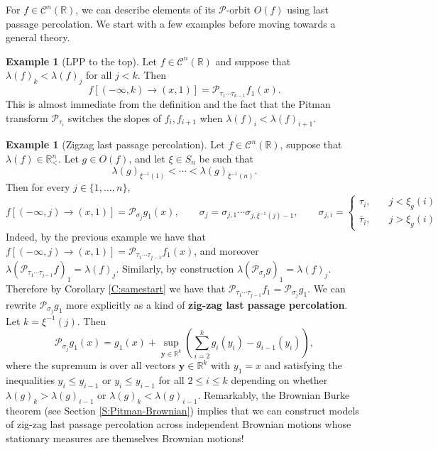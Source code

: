 \documentclass[11pt]{article}
\newcommand{\R}{\mathbb{R}}
\newcommand{\sig}{\sigma}
\newcommand{\la}{\lambda}
\newcommand{\cC}{\mathcal{C}}
\newcommand{\cP}{\mathcal{P}}
\newcommand{\by}{\mathbf{y}}
\theoremstyle{definition} %
\newtheorem{example}[theorem]{Example}
\theoremstyle{remark} %
\begin{document}
For $f \in \cC^n(\R)$, we can describe elements of its $\cP$-orbit $O(f)$ using last passage percolation. We start with a few examples before moving towards a general theory.

\begin{example}[LPP to the top]
	\label{Ex:cars}
Let $f \in \cC^n(\R)$ and suppose that $\la(f)_k < \la(f)_j$ for all $j < k$.	Then 
	\begin{equation}\label{e:cars}
		f[(-\infty, k)\to (x,1)]=\cP_{\tau_1\cdots \tau_{k-1}} f_1(x).
	\end{equation}
This is almost immediate from the definition and the fact that the Pitman transform $\cP_{\tau_i}$ switches the slopes of $f_i, f_{i+1}$ when $\la(f)_i < \la(f)_{i+1}$.  
\end{example}
\begin{example}[Zigzag last passage percolation]
\label{Ex:zigzag}
Let $f \in \cC^n(\R)$, suppose that $\la(f) \in \R^n_<$. Let $g \in O(f)$, and let $\xi \in S_n$ be such that 
$$
\la(g)_{\xi^{-1}(1)} < \cdots < \la(g)_{\xi^{-1}(n)}.
$$
Then for every $j \in \{1, \dots, n\}$, 
$$
f[(-\infty, j)\to (x,1)]=\cP_{\sigma_j}g_1(x), \qquad \sigma_j=\sigma_{j,1}\cdots \sigma_{j,\xi^{-1}(j)-1}, \!\!\qquad \sigma_{j,i}=\begin{cases} \tau_i, \quad  &j<\xi_g(i)\\ \bar \tau_i, &j>\xi_g(i)\end{cases} 
$$
Indeed, by the previous example we have that $f[(-\infty, j)\to (x,1)] = \cP_{\tau_1\cdots \tau_{j-1}} f_1(x)$, and moreover $\la( \cP_{\tau_1\cdots \tau_{j-1}} f)_1 = \la(f)_j$. Similarly, by construction $\la(\cP_{\sig_j} g)_1 = \la(f)_j$. Therefore by Corollary \ref{C:samestart} we have that $\cP_{\tau_1\cdots \tau_{j-1}} f_1 = \cP_{\sig_j} g_1$. We can rewrite $\cP_{\sig_j} g_1$ more explicitly as a kind of \textbf{zig-zag last passage percolation}. Let $k = \xi^{-1}(j)$. Then
	$$
\cP_{\sigma_j}g_1(x)=g_1(x)+\sup_{\by \in \R^{k}}\left(\sum_{i=2}^{k} g_{i}(y_i)-g_{i-1}(y_i)\right),
$$
where the supremum is over all vectors $\by \in \R^{k}$ with $y_1 = x$ and satisfying the inequalities $y_i \le y_{i-1}$ or $y_{i} \le y_{i-1}$ for all $2 \le i \le k$ depending on whether $\la(g)_k > \la(g)_{i-1}$ or $\la(g)_k < \la(g)_{i-1}$. Remarkably, the Brownian Burke theorem (see Section \ref{S:Pitman-Brownian}) implies that we can construct models of zig-zag last passage percolation across independent Brownian motions whose stationary measures are themselves Brownian motions!
\end{example}
\end{document}
